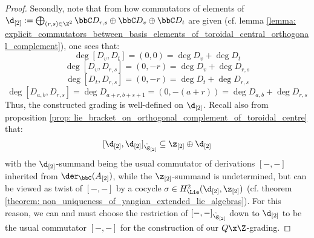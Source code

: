 \begin{proof}
                Secondly, note that from how commutators of elements of $\d_{[2]} := \bigoplus_{(r, s) \in \Z^2} \bbC D_{r, s} \oplus \bbC D_v \oplus \bbC D_t$ are given (cf. lemma \ref{lemma: explicit_commutators_between_basis_elements_of_toroidal_central_orthogonal_complement}), one sees that:
                    $$\deg [D_v, D_t] = (0, 0) = \deg D_v + \deg D_t$$
                    $$\deg [D_v, D_{r, s}] = (0, -r) = \deg D_v + \deg D_{r, s}$$
                    $$\deg [D_t, D_{r, s}] = (0, -r) = \deg D_t + \deg D_{r, s}$$
                    $$\deg [D_{a, b}, D_{r, s}] = \deg D_{a + r, b + s + 1} = (0, -(a + r)) = \deg D_{a, b} + \deg D_{r, s}$$
                Thus, the constructed grading is well-defined on $\d_{[2]}$. Recall also from proposition \ref{prop: lie_bracket_on_orthogonal_complement_of_toroidal_centre} that:
                    $$[\d_{[2]}, \d_{[2]}]_{\hat{\g}_{[2]}} \subseteq \z_{[2]} \oplus \d_{[2]}$$
                with the $\d_{[2]}$-summand being the usual commutator of derivations $[-, -]$ inherited from $\der_{\bbC}(A_{[2]})$, while the $\z_{[2]}$-summand is undetermined, but can be viewed as twist of $[-, -]$ by a cocycle $\sigma \in H^2_{\Lie}(\d_{[2]}, \z_{[2]})$ (cf. theorem \ref{theorem: non_uniqueness_of_yangian_extended_lie_algebras}). For this reason, we can and must choose the restriction of $[-, -]_{\hat{\g}_{[2]}}$ down to $\d_{[2]}$ to be the usual commutator $[-, -]$ for the construction of our $Q \x \Z$-grading. 
            \end{proof}
        
